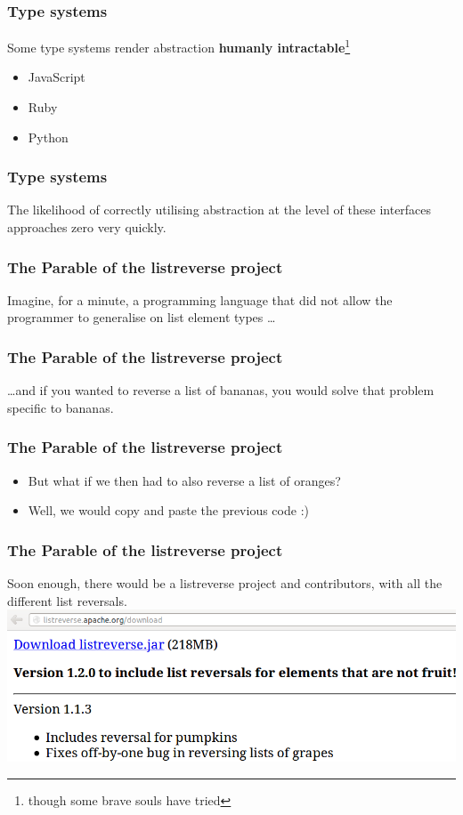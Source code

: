 \begin{frame}
\frametitle{Type systems}
\begin{block}{Some type systems render abstraction \textbf{humanly intractable}}\footnote{though some brave souls have tried}
\begin{itemize}
\item JavaScript
\item Ruby
\item Python
\end{itemize}
\end{block}
\end{frame}

\begin{frame}
\frametitle{Type systems}
\begin{center}
The likelihood of correctly utilising abstraction at the level of these interfaces approaches zero very quickly.
\end{center}
\end{frame}

\begin{frame}
\frametitle{The Parable of the listreverse project}
\begin{center}
Imagine, for a minute, a programming language that did not allow the programmer to generalise on list element types \ldots
\end{center}
\end{frame}

\begin{frame}
\frametitle{The Parable of the listreverse project}
\begin{center}
\ldots and if you wanted to reverse a list of bananas, you would solve that problem specific to bananas. 
\end{center}
\end{frame}

\begin{frame}[fragile]
\frametitle{The Parable of the listreverse project}
\begin{itemize}
\item<1-> But what if we then had to also reverse a list of oranges?
\item<2-> Well, we would copy and paste the previous code :)
\end{itemize}
\end{frame}

\begin{frame}
\frametitle{The Parable of the listreverse project}
Soon enough, there would be a listreverse project and contributors, with all the different list reversals.
\vfill
\includegraphics[height=0.3\textheight,natwidth=840,natheight=285]{image/listreverse.png}
\end{frame}

